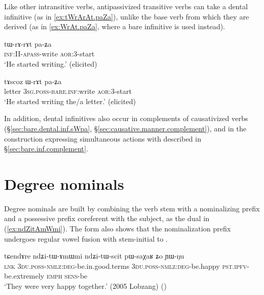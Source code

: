 Like other intransitive verbs, antipassivized transitive verbs can take a dental infinitive (as in \ref{ex:tWrArAt.paZa}), unlike the base verb from which they are derived (as in \ref{ex:WrAt.paZa}, where a bare infinitive is used instead).

\begin{exe}
\ex \label{ex:tWrArAt.paZa}
\gll tɯ-rɤ-rɤt pa-ʑa \\
\textsc{inf}:II-\textsc{apass}-write \textsc{aor}:3\flobv{}-start \\
\glt `He started writing.' (elicited)
\end{exe}

\begin{exe}
\ex \label{ex:WrAt.paZa}
\gll tɤscoz ɯ-rɤt pa-ʑa \\
letter \textsc{3sg}.\textsc{poss}-\textsc{bare}.\textsc{inf:}write \textsc{aor}:3\flobv{}-start \\
\glt `He started writing the/a letter.' (elicited)
\end{exe}

In addition, dental infinitives also occur in complements of causativized verbs (§\ref{sec:bare.dental.inf.sWpa}, §\ref{sec:causative.manner.complement}), and in the construction expressing simultaneous actions with  described in §\ref{sec:bare.inf.complement}.

\section{Degree nominals} \label{sec:degree.nominals}

Degree nominals are built by combining the verb stem with a nominalizing  prefix and a possessive prefix coreferent with the subject, as the dual  in (\ref{ex:ndZitAmWmi}). The form  also shows that the nominalization  prefix undergoes regular vowel fusion with stem-initial  to . 

 \begin{exe}
\ex \label{ex:ndZitAmWmi}
\gll  tɕendɤre ndʑi-tɯ-ɤmɯmi ndʑi-tɯ-scit pɯ-saχaʁ ʑo ɲɯ-ŋu \\
 \textsc{lnk} \textsc{3du}.\textsc{poss}-\textsc{nmlz}:\textsc{deg}-be.in.good.terms \textsc{3du}.\textsc{poss}-\textsc{nmlz}:\textsc{deg}-be.happy \textsc{pst}.\textsc{ipfv}-be.extremely \textsc{emph} \textsc{sens}-be \\
 \glt `They were very happy together.' (2005 Lobzang)
()
\end{exe}

